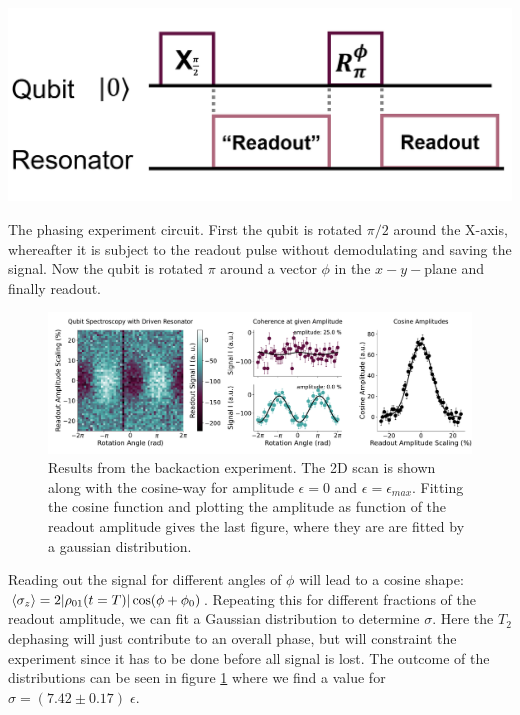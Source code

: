 \begin{marginfigure}[-4 cm]
    \centering
    \includegraphics[]{Figs/circuits/dephasing.png}
    \caption{The phasing experiment circuit. First the qubit is rotated $\pi/2$ around the X-axis, whereafter it is subject to the readout pulse without demodulating and saving the signal. Now the qubit is rotated $\pi$ around a vector $\phi$ in the $x-y-$plane and finally readout.}
    \label{fig:efficiency_dephasing_experiment}
\end{marginfigure}
\begin{figure}
    \centering
    \includegraphics{Calibrations/Figures/dephasing_by_measurement.pdf}
    \caption{Results from the backaction experiment. The 2D scan is shown along with the cosine-way for amplitude $\epsilon = 0$ and $\epsilon = \epsilon_{max}$. Fitting the cosine function and plotting the amplitude as function of the readout amplitude gives the last figure, where they are are fitted by a gaussian distribution.}
    \label{fig:efficiency_dephasing_result}
\end{figure}

Reading out the signal for different angles of $\phi$ will lead to a cosine shape: $\expval{\sigma_z} = 2 |\rho_{01}(t= T)| \cos(\phi+\phi_0)$. Repeating this for different fractions of the readout amplitude, we can fit a Gaussian distribution to determine $\sigma$. Here the $T_2$ dephasing will just contribute to an overall phase, but will constraint the experiment since it has to be done before all signal is lost. The outcome of the distributions can be seen in figure \ref{fig:efficiency_dephasing_result} where we find a value for $\sigma = (7.42 \pm 0.17) \; \epsilon$.

